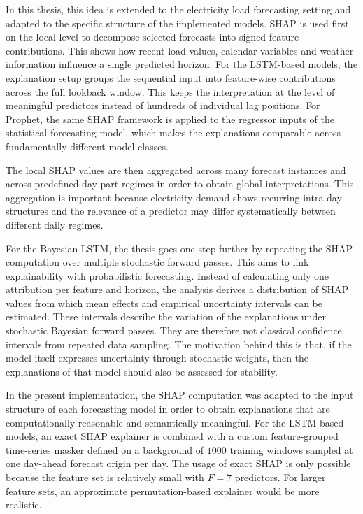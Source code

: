 \documentclass[Master,english,IEEE]{twbook}
\begin{document}
In this thesis, this idea is extended to the electricity load forecasting setting and adapted to the specific structure of the implemented models. SHAP is used first on the local level to decompose selected forecasts into signed feature contributions. This shows how recent load values, calendar variables and weather information influence a single predicted horizon. For the LSTM-based models, the explanation setup groups the sequential input into feature-wise contributions across the full lookback window. This keeps the interpretation at the level of meaningful predictors instead of hundreds of individual lag positions. For Prophet, the same SHAP framework is applied to the regressor inputs of the statistical forecasting model, which makes the explanations comparable across fundamentally different model classes.

The local SHAP values are then aggregated across many forecast instances and across predefined day-part regimes in order to obtain global interpretations. This aggregation is important because electricity demand shows recurring intra-day structures and the relevance of a predictor may differ systematically between different daily regimes.

For the Bayesian LSTM, the thesis goes one step further by repeating the SHAP computation over multiple stochastic forward passes. This aims to link explainability with probabilistic forecasting. Instead of calculating only one attribution per feature and horizon, the analysis derives a distribution of SHAP values from which mean effects and empirical uncertainty intervals can be estimated. These intervals describe the variation of the explanations under stochastic Bayesian forward passes. They are therefore not classical confidence intervals from repeated data sampling. The motivation behind this is that, if the model itself expresses uncertainty through stochastic weights, then the explanations of that model should also be assessed for stability.

In the present implementation, the SHAP computation was adapted to the input structure of each forecasting model in order to obtain explanations that are computationally reasonable and semantically meaningful. For the LSTM-based models, an exact SHAP explainer is combined with a custom feature-grouped time-series masker defined on a background of $1000$ training windows sampled at one day-ahead forecast origin per day. The usage of exact SHAP is only possible because the feature set is relatively small with $F=7$ predictors. For larger feature sets, an approximate permutation-based explainer would be more realistic.
\end{document}
